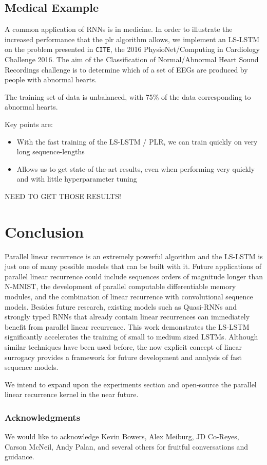 \documentclass{article}
\begin{document}
\subsection{Medical Example}
A common application of RNNs is in medicine. In order to illustrate the increased
performance that the plr algorithm allows, we implement an LS-LSTM on the problem
presented in \texttt{CITE}, the 2016 PhysioNet/Computing in Cardiology Challenge 2016.
The aim of the Classification of Normal/Abnormal Heart Sound Recordings challenge
is to determine which of a set of EEGs are produced by people with abnormal hearts.

The training set of data is unbalanced, with 75\% of the data corresponding to abnormal
hearts. 

Key points are:
\begin{itemize}
\item{With the fast training of the LS-LSTM / PLR, we can train quickly on very
    long sequence-lengths}
\item{Allows us to get state-of-the-art results, even when performing very quickly
    and with little hyperparameter tuning}
\end{itemize}

NEED TO GET THOSE RESULTS!

  
\section{Conclusion}
Parallel linear recurrence is an extremely powerful algorithm and the LS-LSTM is just one
of many possible models that can be built with it. Future applications of parallel linear recurrence could include sequences orders of magnitude longer than N-MNIST, the development of parallel computable differentiable memory modules, and the combination of linear recurrence with convolutional sequence models. Besides future research, existing models such as Quasi-RNNs and strongly typed RNNs that already contain linear recurrences can immediately benefit from parallel linear recurrence. This work demonstrates the LS-LSTM significantly accelerates the training of small to medium sized LSTMs. Although similar techniques have been used before, the now explicit concept of linear surrogacy provides a framework for future development and analysis of fast sequence models.

We intend to expand upon the experiments section and open-source the parallel linear recurrence kernel in the near future.

\subsubsection*{Acknowledgments}
We would like to acknowledge Kevin Bowers, Alex Meiburg, JD Co-Reyes, Carson
McNeil, Andy Palan, and several others for fruitful conversations and guidance.
\end{document}
